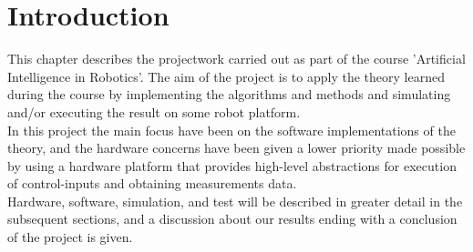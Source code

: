 
\section{Introduction} %
\label{sec:project_introduction}

This chapter describes the projectwork carried out as part of the course 'Artificial Intelligence in Robotics'. The aim of the project is to apply the theory learned during the course by implementing the algorithms and methods and simulating and/or executing the result on some robot platform.\\

In this project the main focus have been on the software implementations of the theory, and the hardware concerns have been given a lower priority made possible by using a hardware platform that provides high-level abstractions for execution of control-inputs and obtaining measurements data.\\

Hardware, software, simulation, and test will be described in greater detail in the subsequent sections, and a discussion about our results ending with a conclusion of the project is given.

